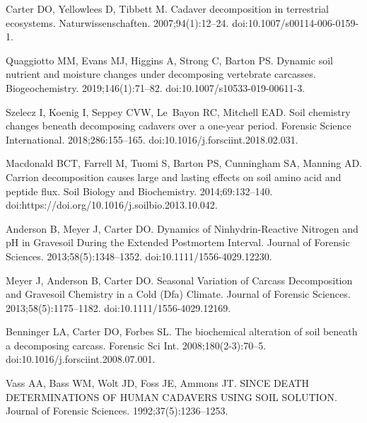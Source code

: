 \documentclass[
  10pt,
  letterpaper,
]{article}
\begin{document}
\begin{thebibliography}{10}
    Carter DO, Yellowlees D, Tibbett M.
    \newblock Cadaver decomposition in terrestrial ecosystems.
    \newblock Naturwissenschaften. 2007;94(1):12--24.
    \newblock doi:{10.1007/s00114-006-0159-1}.
    
    Quaggiotto MM, Evans MJ, Higgins A, Strong C, Barton PS.
    \newblock Dynamic soil nutrient and moisture changes under decomposing vertebrate carcasses.
    \newblock Biogeochemistry. 2019;146(1):71--82.
    \newblock doi:{10.1007/s10533-019-00611-3}.
    
    Szelecz I, Koenig I, Seppey CVW, Le~Bayon RC, Mitchell EAD.
    \newblock Soil chemistry changes beneath decomposing cadavers over a one-year period.
    \newblock Forensic Science International. 2018;286:155--165.
    \newblock doi:{10.1016/j.forsciint.2018.02.031}.
    
    Macdonald BCT, Farrell M, Tuomi S, Barton PS, Cunningham SA, Manning AD.
    \newblock Carrion decomposition causes large and lasting effects on soil amino acid and peptide flux.
    \newblock Soil Biology and Biochemistry. 2014;69:132--140.
    \newblock doi:{https://doi.org/10.1016/j.soilbio.2013.10.042}.
    
    Anderson B, Meyer J, Carter DO.
    \newblock Dynamics of {Ninhydrin}-{Reactive} {Nitrogen} and {pH} in {Gravesoil} {During} the {Extended} {Postmortem} {Interval}.
    \newblock Journal of Forensic Sciences. 2013;58(5):1348--1352.
    \newblock doi:{10.1111/1556-4029.12230}.
    
    Meyer J, Anderson B, Carter DO.
    \newblock Seasonal {Variation} of {Carcass} {Decomposition} and {Gravesoil} {Chemistry} in a {Cold} ({Dfa}) {Climate}.
    \newblock Journal of Forensic Sciences. 2013;58(5):1175--1182.
    \newblock doi:{10.1111/1556-4029.12169}.
    
    Benninger LA, Carter DO, Forbes SL.
    \newblock The biochemical alteration of soil beneath a decomposing carcass.
    \newblock Forensic Sci Int. 2008;180(2-3):70--5.
    \newblock doi:{10.1016/j.forsciint.2008.07.001}.
    
    Vass AA, Bass WM, Wolt JD, Foss JE, Ammons JT.
     {SINCE} {DEATH} {DETERMINATIONS} {OF} {HUMAN} {CADAVERS} {USING} {SOIL} {SOLUTION}.
    \newblock Journal of Forensic Sciences. 1992;37(5):1236--1253.
    

\end{thebibliography}
\end{document}
